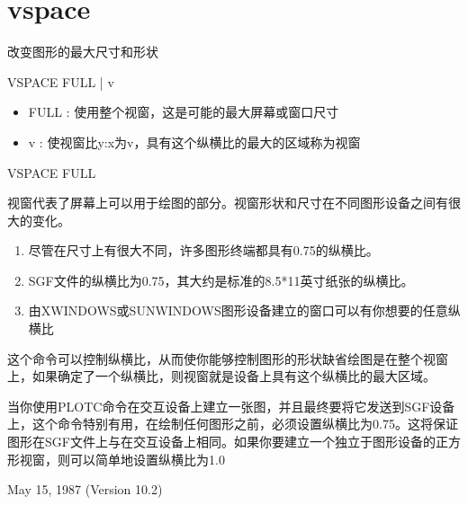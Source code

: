 \section{vspace}
\label{cmd:vspace}

改变图形的最大尺寸和形状

VSPACE FULL | v

\begin{itemize}
\item FULL : 使用整个视窗，这是可能的最大屏幕或窗口尺寸 
\item v : 使视窗比y:x为v，具有这个纵横比的最大的区域称为视窗 
\end{itemize}

VSPACE FULL

视窗代表了屏幕上可以用于绘图的部分。视窗形状和尺寸在不同图形设备之间有很大的变化。
\begin{enumerate}
\item 尽管在尺寸上有很大不同，许多图形终端都具有0.75的纵横比。
\item SGF文件的纵横比为0.75，其大约是标准的8.5*11英寸纸张的纵横比。
\item  由XWINDOWS或SUNWINDOWS图形设备建立的窗口可以有你想要的任意纵横比
\end{enumerate}

这个命令可以控制纵横比，从而使你能够控制图形的形状缺省绘图是在整个视窗上，如果确定了一个纵横比，则视窗就是设备上具有这个纵横比的最大区域。

当你使用PLOTC命令在交互设备上建立一张图，并且最终要将它发送到SGF设备上，这个命令特别有用，在绘制任何图形之前，必须设置纵横比为0.75。这将保证图形在SGF文件上与在交互设备上相同。如果你要建立一个独立于图形设备的正方形视窗，则可以简单地设置纵横比为1.0

May 15, 1987 (Version 10.2)

